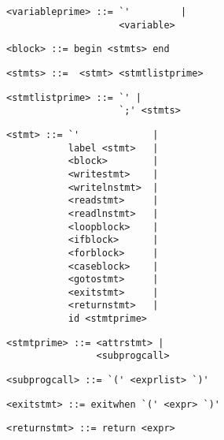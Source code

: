 \begin{footnotesize}
\begin{lstlisting}[frame=single, label={variableprime}, language=pie]
<variableprime> ::= `'         |
                    <variable> 
\end{lstlisting}

\begin{lstlisting}[frame=single, label={block}, language=pie]
<block> ::= begin <stmts> end
\end{lstlisting}

\begin{lstlisting}[frame=single, label={stmts}, language=pie]
<stmts> ::=  <stmt> <stmtlistprime>
\end{lstlisting}

\begin{lstlisting}[frame=single, label={stmtlistprime}, language=pie]
<stmtlistprime> ::= `' |
                    `;' <stmts>
\end{lstlisting}

\begin{lstlisting}[frame=single, label={stmt}, language=pie]
<stmt> ::= `'             | 
           label <stmt>   |
           <block>        |
           <writestmt>    |
           <writelnstmt>  |
           <readstmt>     |
           <readlnstmt>   |
           <loopblock>    |
           <ifblock>      |
           <forblock>     |
           <caseblock>    |
           <gotostmt>     |
           <exitstmt>     |
           <returnstmt>   |
           id <stmtprime>
\end{lstlisting}

\begin{lstlisting}[frame=single, label={stmtprime}, language=pie]
<stmtprime> ::= <attrstmt> |
                <subprogcall>
\end{lstlisting}

\begin{lstlisting}[frame=single, label={subprogcall}, language=pie]
<subprogcall> ::= `(' <exprlist> `)'
\end{lstlisting}

\begin{lstlisting}[frame=single, label={exitstmt}, language=pie]
<exitstmt> ::= exitwhen `(' <expr> `)'
\end{lstlisting}

\begin{lstlisting}[frame=single, label={returnstmt}, language=pie]
<returnstmt> ::= return <expr>
\end{lstlisting}


\end{footnotesize}
